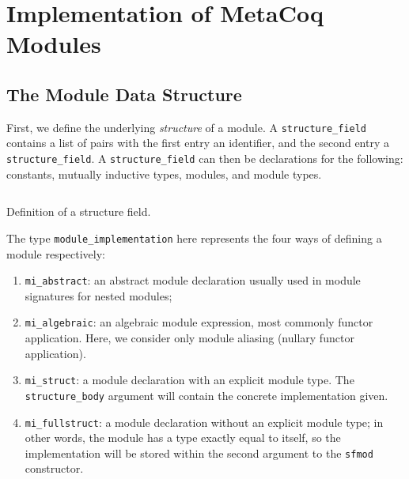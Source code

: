 \chapter{Implementation of MetaCoq Modules}
\label{ch:impl1}
\newcommand{\tc}[3]{
  \inputminted[firstline={#1},lastline={#2},linenos]{Coq}{code/v1/template-coq/theories/#3}
  }

\newcommand{\pcuic}[3]{\inputminted[firstline={#1},lastline={#2},linenos]{Coq}{
code/v1/pcuic/theories/#3}}


\section{The Module Data Structure}

First, we define the underlying \emph{structure} of a module. A
\verb|structure_field| contains a list of pairs with the first entry an
identifier, and the second entry a \verb|structure_field|. A
\verb|structure_field| can then be declarations for the following: constants,
mutually inductive types, modules, and module types.

\begin{listing}[H]
  \tc{324}{336}{Environment.v}
  \caption{Definition of a structure field.}
  \label{lst:1-def-sf}
\end{listing}

The type \verb|module_implementation| here represents the four ways of defining
a module respectively:
\begin{enumerate}
  \item \verb|mi_abstract|: an abstract module declaration usually used in
  module signatures for nested modules;
  \item \verb|mi_algebraic|: an algebraic module expression, most commonly
  functor application. Here, we consider only module aliasing (nullary functor
  application).
  \item \verb|mi_struct|: a module declaration with an explicit module type. The
  \verb|structure_body| argument will contain the concrete implementation given.
  \item \verb|mi_fullstruct|: a module declaration without an explicit module
  type; in other words, the module has a type exactly equal to itself, so the
  implementation will be stored within the second argument to the \verb|sfmod|
  constructor.
\end{enumerate}

